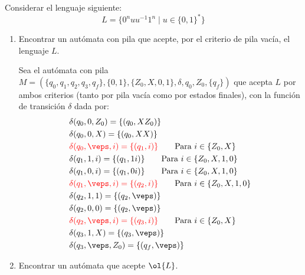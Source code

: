 \begin{ejercicio}\label{ej:1.6.4}
    Considerar el lenguaje siguiente:
    \begin{equation*}
        L = \{0^n uu^{-1}1^n \mid u\in {\{0,1\}}^{\ast}\}
    \end{equation*}
    \begin{enumerate}
        \item Encontrar un autómata con pila que acepte, por el criterio de pila vacía, el lenguaje $L$.
        
        Sea el autómata con pila $M = (\{q_0,q_1,q_2,q_3,q_f\},\{0,1\},\{Z_0,X,0,1\},\delta,q_0,Z_0,\{q_f\})$ que acepta $L$ por ambos criterios (tanto por pila vacía como por estados finales), con la función de transición $\delta$ dada por:
        \begin{align*}
            &\delta(q_0,0,Z_0) = \{(q_0,XZ_0)\} \\
            &\delta(q_0,0,X) = \{(q_0,XX)\} \\
            &\red{\delta(q_0,\veps,i) = \{(q_1,i)\}} \qquad \text{Para } i\in \{Z_0,X\} \\
            &\delta(q_1,1,i) = \{(q_1,1i)\} \qquad \text{Para } i\in \{Z_0,X,1,0\} \\
            &\delta(q_1,0,i) = \{(q_1,0i)\} \qquad \text{Para } i\in \{Z_0,X,1,0\} \\
            &\red{\delta(q_1,\veps,i) = \{(q_2,i)\}} \qquad \text{Para } i\in \{Z_0,X,1,0\} \\
            &\delta(q_2,1,1) = \{(q_2,\veps)\} \\
            &\delta(q_2,0,0) = \{(q_2,\veps)\} \\
            &\red{\delta(q_2,\veps,i) = \{(q_3,i)\}} \qquad \text{Para } i\in \{Z_0,X\} \\
            &\delta(q_3,1,X) = \{(q_3,\veps)\} \\
            &\delta(q_3,\veps,Z_0) = \{(q_f,\veps)\}
        \end{align*}

        \item Encontrar un autómata que acepte $\ol{L}$.
    \end{enumerate}
\end{ejercicio}

